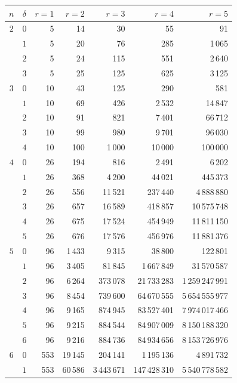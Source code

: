 \documentclass[11pt, a4paper, abstract=yes]{scrartcl}
\theoremstyle{definition}
\theoremstyle{remark}
\theoremstyle{plain}
\begin{document}
\begin{center}
\begin{tabular}{@{}ccrrrrr@{}}
\toprule
\(n\) & \(\delta\) & \(r=1\) & \(r=2\) & \(r=3\) & \(r=4\) & \(r=5\)\\
\midrule
\(2\) & \(0\) & 5 & 14 & 30 & 55 & 91\\
 & \(1\) & 5 & 20 & 76 & 285 & 1\,065\\
 & \(2\) & 5 & 24 & 115 & 551 & 2\,640\\
 & \(3\) & 5 & 25 & 125 & 625 & 3\,125\\
\addlinespace
\(3\) & \(0\) & 10 & 43 & 125 & 290 & 581\\
 & \(1\) & 10 & 69 & 426 & 2\,532 & 14\,847\\
 & \(2\) & 10 & 91 & 821 & 7\,401 & 66\,712\\
 & \(3\) & 10 & 99 & 980 & 9\,701 & 96\,030\\
 & \(4\) & 10 & 100 & 1\,000 & 10\,000 & 100\,000\\
\addlinespace
\(4\) & \(0\) & 26 & 194 & 816 & 2\,491 & 6\,202\\
 & \(1\) & 26 & 368 & 4\,200 & 44\,021 & 445\,373\\
 & \(2\) & 26 & 556 & 11\,521 & 237\,440 & 4\,888\,880\\
 & \(3\) & 26 & 657 & 16\,589 & 418\,857 & 10\,575\,748\\
 & \(4\) & 26 & 675 & 17\,524 & 454\,949 & 11\,811\,150\\
 & \(5\) & 26 & 676 & 17\,576 & 456\,976 & 11\,881\,376\\
\addlinespace
\(5\) & \(0\) & 96 & 1\,433 & 9\,315 & 38\,800 & 122\,801\\
 & \(1\) & 96 & 3\,405 & 81\,845 & 1\,667\,849 & 31\,570\,587\\
 & \(2\) & 96 & 6\,264 & 373\,078 & 21\,733\,283 & 1\,259\,247\,991\\
 & \(3\) & 96 & 8\,454 & 739\,600 & 64\,670\,555 & 5\,654\,555\,977\\
 & \(4\) & 96 & 9\,165 & 874\,945 & 83\,527\,401 & 7\,974\,017\,466\\
 & \(5\) & 96 & 9\,215 & 884\,544 & 84\,907\,009 & 8\,150\,188\,320\\
 & \(6\) & 96 & 9\,216 & 884\,736 & 84\,934\,656 & 8\,153\,726\,976\\
\addlinespace
\(6\) & \(0\) & 553 & 19\,145 & 204\,141 & 1\,195\,136 & 4\,891\,732\\
 & \(1\) & 553 & 60\,586 & 3\,443\,671 & 147\,428\,310 & 5\,540\,778\,582\\

\end{tabular}
\end{center}
\end{document}
